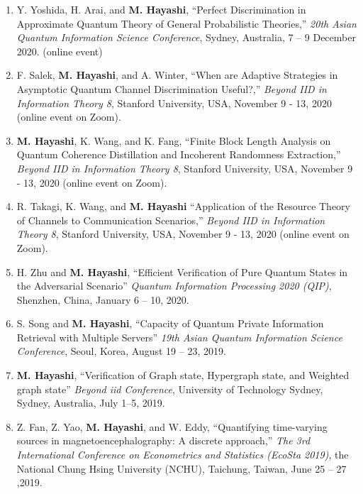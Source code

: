 \documentclass[a4paper,12pt,oneside]{article}
\begin{document}
\begin{enumerate}
\item
Y. Yoshida, H. Arai, and \textbf{M. Hayashi},
``Perfect Discrimination in Approximate Quantum Theory of General Probabilistic Theories,''
{\em 20th Asian Quantum Information Science Conference},
Sydney, Australia, 7 -- 9 December 2020. (online event)

\item
F. Salek, \textbf{M. Hayashi}, and A. Winter,
``When are Adaptive Strategies in Asymptotic Quantum Channel Discrimination Useful?,''
{\em Beyond IID in Information Theory 8}, Stanford University, USA, November 9 - 13, 2020 (online event on Zoom).

\item
\textbf{M. Hayashi}, K. Wang, and K. Fang,
``Finite Block Length Analysis on Quantum Coherence Distillation and Incoherent Randomness Extraction,''
{\em Beyond IID in Information Theory 8}, Stanford University, USA, November 9 - 13, 2020 (online event on Zoom).

\item
R. Takagi, K. Wang, and \textbf{M. Hayashi} 
``Application of the Resource Theory of Channels to Communication Scenarios,''
{\em Beyond IID in Information Theory 8}, Stanford University, USA, November 9 - 13, 2020 (online event on Zoom).

\item 
H. Zhu and \textbf{M. Hayashi}, 
``Efficient Verification of Pure Quantum States in the Adversarial Scenario''
{\em Quantum Information Processing 2020 (QIP)}, 
Shenzhen, China, January 6 -- 10, 2020.


\item 
S. Song and \textbf{M. Hayashi}, 
``Capacity of Quantum
Private Information Retrieval with Multiple Servers''
{\em 19th Asian Quantum Information Science Conference},
Seoul, Korea, August 19 -- 23, 2019.

\item 
\textbf{M. Hayashi}, 
``Verification of Graph state, Hypergraph state, and Weighted graph state''
{\em Beyond iid Conference},
University of Technology Sydney, Sydney, Australia, 
July 1--5, 2019.

\item 
Z. Fan, Z. Yao, \textbf{M. Hayashi}, and W. Eddy,
``Quantifying time-varying sources in magnetoencephalography: A discrete approach,''
{\em The 3rd International Conference on Econometrics and Statistics (EcoSta 2019)},
the National Chung Hsing University (NCHU), Taichung, Taiwan, June 25 -- 27 ,2019.


\end{enumerate}
\end{document}
